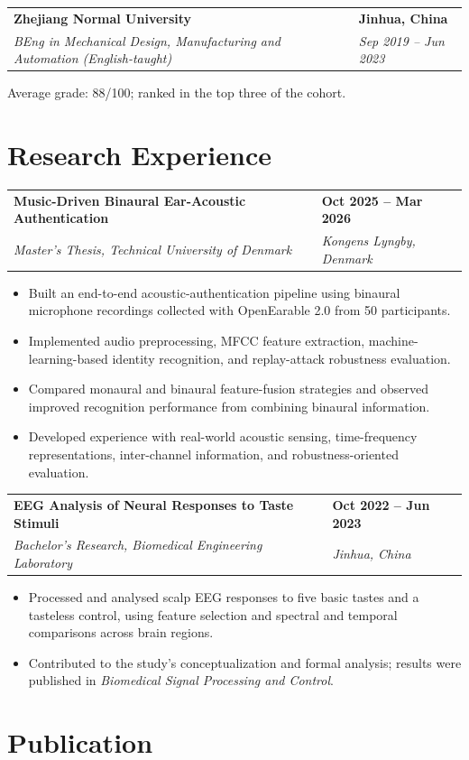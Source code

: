 \documentclass[a4paper,11pt]{article}
\makeatletter
\newcommand{\resumeSubheading}[4]{%
  \noindent
  \begin{tabularx}{\textwidth}{@{}X>{\raggedleft\arraybackslash}p{3.55cm}@{}}
    \textbf{#1} & \textbf{#2} \\
    \textit{#3} & \textit{#4}
  \end{tabularx}
  \vspace{0.02em}
}
\newcommand{\resumeItemListStart}{%
  \begin{itemize}[
    leftmargin=1.25em,
    label=\textendash,
    itemsep=0.20em,
    topsep=0.20em,
    parsep=0pt,
    partopsep=0pt
  ]
}
\newcommand{\resumeItemListEnd}{\end{itemize}}
\newcommand{\resumeItem}[1]{\item \small #1}
\newcommand{\educationEntry}[4]{%
  \noindent
  \begin{tabularx}{\textwidth}{@{}X>{\raggedleft\arraybackslash}p{3.55cm}@{}}
    \textbf{#1} & \textbf{#2} \\
    \textit{#3} & \textit{#4}
  \end{tabularx}
  \vspace{0.34em}
}
\makeatother
\begin{document}
\educationEntry
  {Zhejiang Normal University}
  {Jinhua, China}
  {BEng in Mechanical Design, Manufacturing and Automation (English-taught)}
  {Sep 2019 -- Jun 2023}

\small
Average grade: 88/100; ranked in the top three of the cohort.
\normalsize

\section{Research Experience}

\resumeSubheading
  {Music-Driven Binaural Ear-Acoustic Authentication}
  {Oct 2025 -- Mar 2026}
  {Master's Thesis, Technical University of Denmark}
  {Kongens Lyngby, Denmark}

\resumeItemListStart
  \resumeItem{Built an end-to-end acoustic-authentication pipeline using binaural microphone recordings collected with OpenEarable 2.0 from 50 participants.}
  \resumeItem{Implemented audio preprocessing, MFCC feature extraction, machine-learning-based identity recognition, and replay-attack robustness evaluation.}
  \resumeItem{Compared monaural and binaural feature-fusion strategies and observed improved recognition performance from combining binaural information.}
  \resumeItem{Developed experience with real-world acoustic sensing, time-frequency representations, inter-channel information, and robustness-oriented evaluation.}
\resumeItemListEnd

\vspace{0.28em}

\resumeSubheading
  {EEG Analysis of Neural Responses to Taste Stimuli}
  {Oct 2022 -- Jun 2023}
  {Bachelor's Research, Biomedical Engineering Laboratory}
  {Jinhua, China}

\resumeItemListStart
  \resumeItem{Processed and analysed scalp EEG responses to five basic tastes and a tasteless control, using feature selection and spectral and temporal comparisons across brain regions.}
  \resumeItem{Contributed to the study's conceptualization and formal analysis; results were published in \textit{Biomedical Signal Processing and Control}.}
\resumeItemListEnd

\section{Publication}
\end{document}
